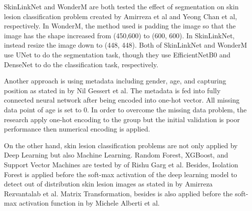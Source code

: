 \documentclass[sensors,article,submit,pdftex,moreauthors]{Definitions/mdpi}
\begin{document}
SkinLinkNet \cite{12602} and WonderM \cite{03426} are both tested the effect of segmentation on skin lesion classification problem created by Amirreza et al and Yeong Chan et al, respectively. In WonderM, the method used is padding the image so that the image has the shape increased from (450,600) to (600, 600). In SkinLinkNet, instead resize the image down to (448, 448). Both of SkinLinkNet and WonderM use UNet to do the segmentation task, though they use EfficientNetB0 and DenseNet to do the classification task, respectively. 

Another approach is using metadata including gender, age, and capturing position as stated in  \cite{03910} by Nil Gessert et al. The metadata is fed into fully connected neural network after being encoded into one-hot vector. All missing data point of age is set to 0. In order to overcome the missing data problem, the research apply one-hot encoding to the group but the initial validation is poor performance then numerical encoding is applied.

On the other hand, skin lesion classification problems are not only applied by Deep Learning but also Machine Learning. Random Forest, XGBoost, and Support Vector Machines are tested by  \cite{03798} of Rishu Garg et al. Besides, Isolation Forest is applied before the soft-max activation of the deep learning model to detect out of distribution skin lesion images as stated in \cite{10348} by Amirreza Rezvantalab et al. Matrix Transformation, besides is also applied before the soft-max activation function in \cite{05045} by Michele Alberti et al. 
\end{document}
